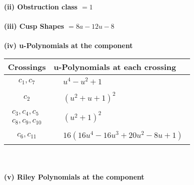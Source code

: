 \documentclass[1p]{elsarticle_modified}
\theoremstyle{definition}
\begin{document}
\flushleft \textbf{(ii) Obstruction class $= 1$}\\~\\
\flushleft \textbf{(iii) Cusp Shapes $= 8 a-12 u-8$}\\~\\
\newpage\renewcommand{\arraystretch}{1}
\flushleft \textbf{(iv) u-Polynomials at the component}\newline \\
\begin{tabular}{m{50pt}|m{274pt}}
Crossings & \hspace{64pt}u-Polynomials at each crossing \\
\hline $$\begin{aligned}c_{1},c_{7}\end{aligned}$$&$\begin{aligned}
&u^4- u^2+1
\end{aligned}$\\
\hline $$\begin{aligned}c_{2}\end{aligned}$$&$\begin{aligned}
&(u^2+u+1)^2
\end{aligned}$\\
\hline $$\begin{aligned}c_{3},c_{4},c_{5}\\c_{8},c_{9},c_{10}\end{aligned}$$&$\begin{aligned}
&(u^2+1)^2
\end{aligned}$\\
\hline $$\begin{aligned}c_{6},c_{11}\end{aligned}$$&$\begin{aligned}
&16(16 u^4-16 u^3+20 u^2-8 u+1)
\end{aligned}$\\
\hline
\end{tabular}\\~\\
\newpage\renewcommand{\arraystretch}{1}
\flushleft \textbf{(v) Riley Polynomials at the component}\newline \\
\end{document}
